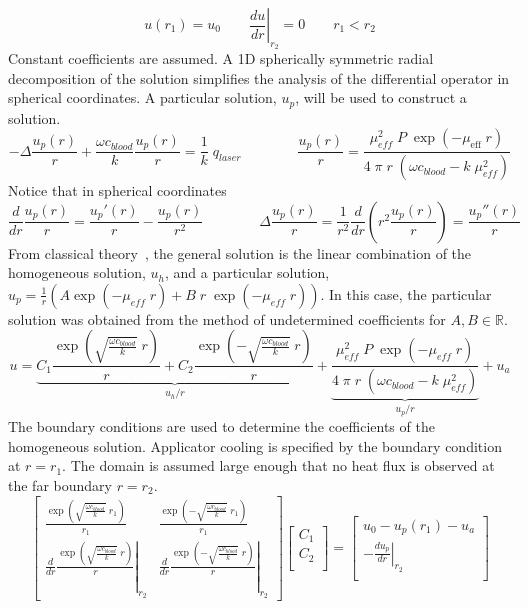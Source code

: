 \documentclass{article}         %
\theoremstyle{definition}
\theoremstyle{remark}
\begin{document}
\[
   u(r_1) = u_0
  \qquad
  \left. \frac{d u}{dr} \right|_{r_2}  = 0
  \qquad
   r_1 < r_2
\]
Constant coefficients are assumed. A 1D spherically symmetric radial decomposition 
of the solution
simplifies the analysis of the differential operator in spherical coordinates.
A particular solution, $u_p$, will be used to construct a solution. 
\[
 -\Delta  \frac{u_p(r)}{r} 
 + \frac{\omega c_\textit{blood}}{k}  \frac{u_p(r)}{r} 
 = \frac{1}{k} \; q_\textit{laser}
\qquad
\qquad
  \frac{u_p(r)}{r}  = 
    \frac{\mu_\textit{eff}^2 \; P \; \exp \left(-\mu_\text{eff} \; r \right) }
         { 4 \; \pi \; r \; \left(\omega c_\textit{blood}-k \; \mu_\textit{eff}^2 \right)} 
\]
Notice that in spherical coordinates
\[
  \frac{d}{dr}  \frac{u_p(r)}{r} 
   = 
    \frac{u_p'(r)}{r}  - \frac{u_p(r)}{r^2}   
  \qquad
  \qquad
 \Delta  \frac{u_p(r)}{r} 
   = 
  \frac{1}{r^2} 
  \frac{d}{dr} \left( r^2 \frac{u_p(r)}{r}  \right)
   = 
    \frac{u_p''(r)}{r} 
\]
From classical theory~\cite{boyce1992elementary}, 
the general solution is the linear combination of the homogeneous solution, $u_h$, and
a particular solution, 
$ u_p = \frac{1}{r} \left( A \exp (-\mu_\textit{eff} \; r) + B \; r \;  \exp
(-\mu_\textit{eff} \; r) \right) $.
In this case, the particular solution was obtained from the method of undetermined
coefficients for $A,B \in \mathbb{R}$. 
\begin{equation}\label{OneDSolution}
u = 
  \underbrace{
    C_1 \frac{\exp\left( \sqrt{\frac{\omega c_\textit{blood}}{k}} \; r \right)}{r}  
  + 
    C_2 \frac{\exp\left(-\sqrt{\frac{\omega c_\textit{blood}}{k}} \; r \right)}{r}  
    }_{u_h / r}
  + 
  \underbrace{
    \frac{\mu_\textit{eff}^2 \; P \; \exp \left(-\mu_\textit{eff} \; r \right) }
         { 4 \; \pi \; r \; \left(\omega c_\textit{blood}-k \; \mu_\textit{eff}^2 \right)} 
    }_{u_p / r}
  + 
    u_a
\end{equation}
The boundary conditions are used to determine the coefficients of the homogeneous solution.
Applicator cooling is specified by the boundary condition at $r = r_1$.
The domain is assumed large enough that no heat flux is observed at the far boundary $r = r_2$.
\[
\begin{bmatrix}
    \frac{\exp\left( \sqrt{\frac{\omega c_\textit{blood}}{k}} \; r_1 \right)}{r_1}  
  & 
    \frac{\exp\left(-\sqrt{\frac{\omega c_\textit{blood}}{k}} \; r_1 \right)}{r_1}  
  \\
  \left.
   \frac{d}{dr}
    \frac{\exp\left( \sqrt{\frac{\omega c_\textit{blood}}{k}} \; r \right)}{r}  
  \right|_{r_2}
  & 
  \left.
   \frac{d}{dr}
    \frac{\exp\left(-\sqrt{\frac{\omega c_\textit{blood}}{k}} \; r \right)}{r}  
  \right|_{r_2}
\end{bmatrix}
\begin{bmatrix}
  C_1 \\
  C_2 \\
\end{bmatrix}
= 
\begin{bmatrix}
      u_0 - u_p(r_1) - u_a    \\
  - \left. \frac{d u_p}{dr} 
  \right|_{r_2}\\
\end{bmatrix}
\]
\end{document}
